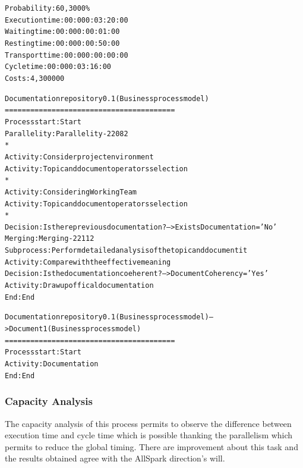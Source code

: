 \begin{alltt}
Probability:   60,3000\%
Execution time:  00:000:03:20:00
Waiting time:  00:000:00:01:00
Resting time:  00:000:00:50:00
Transport time:  00:000:00:00:00
Cycle time:  00:000:03:16:00
Costs:  4,300000

Documentation repository 0.1 (Business process model)
========================================
Process start: Start
Parallelity: Parallelity-22082
    *
    Activity: Consider project environment
    Activity: Topic and document operators selection 
    *
    Activity: Considering Working Team
    Activity: Topic and document operators selection 
    *
    Decision: Is there previous documentation? --> ExistsDocumentation='No'
Merging: Merging-22112
Subprocess: Perform detailed analysis of the topic and document it
Activity: Compare with the effective meaning
Decision: Is the documentation coeherent? --> DocumentCoherency='Yes'
Activity: Draw up offical documentation
End: End

Documentation repository 0.1 (Business process model) --> Document 1 (Business process model)
========================================
Process start: Start
Activity: Documentation
End: End
\end{alltt}


\subsubsection{Capacity Analysis}
The capacity analysis of this process permits to observe the difference between execution time and cycle time which is possible thanking the parallelism which permits to reduce the global timing. There are improvement about this task and the results obtained agree with the AllSpark direction's will.

